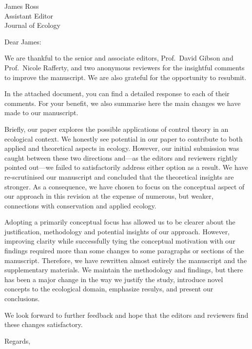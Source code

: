 \documentclass{letter}
\begin{document}
\begin{letter}{James Ross \\ Assistant Editor \\ Journal of Ecology}
\opening{Dear James:}

\onehalfspacing

We are thankful to the senior and associate editors, Prof.\ David Gibson and Prof.\ Nicole Rafferty, and two anonymous reviewers for the insightful comments to improve the manuscript. 
We are also grateful for the opportunity to resubmit. 

In the attached document, you can find a detailed response to each of their comments. 
For your benefit, we also summarise here the main changes we have made to our manuscript. 

Briefly, our paper explores the possible applications of control theory in an ecological context. 
We honestly see potential in our paper to contribute to both applied and theoretical aspects in ecology. 
However, our initial submission was caught between these two directions and---as the editors and reviewers rightly pointed out---we failed to satisfactorily address either option as a result.
We have re-scrutinised our manuscript and concluded that the theoretical insights are stronger. 
As a consequence, we have chosen to focus on the conceptual aspect of our approach in this revision at the expense of numerous, but weaker, connections with conservation and applied ecology.

Adopting a primarily conceptual focus has allowed us to be clearer about the justification, methodology and potential insights of our approach. 
However, improving clarity while successfully tying the conceptual motivation with our findings required more than some changes to some paragraphs or sections of the manuscript. 
Therefore, we have rewritten almost entirely the manuscript and the supplementary materials. 
We maintain the methodology and findings, but there has been a major change in the way we justify the study, introduce novel concepts to the ecological domain, emphasize resulys, and present our conclusions. 

We look forward to further feedback and hope that the editors and reviewers find these changes satisfactory.

\closing{Regards,}
\end{letter}
\end{document}
